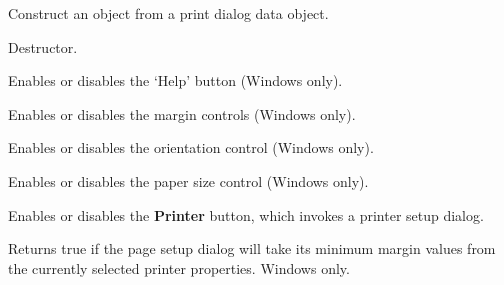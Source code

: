 Construct an object from a print dialog data object.



Destructor.

\label{wxpagesetupdialogdataenablehelp}


Enables or disables the `Help' button (Windows only).

\label{wxpagesetupdialogdataenablemargins}


Enables or disables the margin controls (Windows only).

\label{wxpagesetupdialogdataenableorientation}


Enables or disables the orientation control (Windows only).

\label{wxpagesetupdialogdataenablepaper}


Enables or disables the paper size control (Windows only).

\label{wxpagesetupdialogdataenableprinter}


Enables or disables the {\bf Printer} button, which invokes a printer setup dialog.

\label{wxpagesetupdialogdatagetdefaultminmargins}


Returns true if the page setup dialog will take its minimum margin values from the currently
selected printer properties. Windows only.

\label{wxpagesetupdialogdatagetenablemargins}


